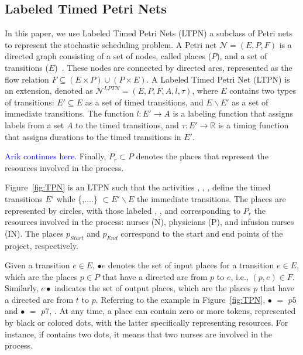 \subsection{Labeled Timed Petri Nets}
\label{sec:LTPN}

In this paper, we use Labeled Timed Petri Nets (LTPN) a subclass of Petri nets to represent the 
stochastic scheduling problem. 
A Petri net $\mathcal{N} = (E, P, F)$ is a directed graph consisting of a set of nodes, called places ($P$), and a set of transitions ($E$)~\cite{murata1989petri}. These nodes are connected by directed arcs, represented as the flow relation $F \subseteq (E \times P) \cup (P \times E)$. A Labeled Timed Petri Net (LTPN) is an extension, denoted as $\mathcal{N}^{LPTN} = (E, P, F, A, l, \tau)$, where $E$ contains two types of transitions: $E' \subseteq E$ as a set of timed transitions, and $E \backslash E'$ as a set of immediate transitions. The function $l : E' \rightarrow A$ is a labeling function that assigns labels from a set $A$ to the timed transitions, and $\tau : E' \rightarrow \mathbb{R}$ is a timing function that assigns durations to the timed transitions in $E'$.

\textcolor{blue}{Arik continues here.}
Finally, $P_r \subset P$ denotes the places that represent the resources involved in the process.

Figure~\ref{fig:TPN} is an LTPN such that the activities , , ,  define the timed transitions $E'$ while \{,....\} $ \subset E'\backslash E$ the immediate transitions.
The places are represented by circles, with those labeled , , and  corresponding to $P_{r}$ the resources involved in the process: nurses (N), physicians (P), and infusion nurses (IN).
The places $p_{Start}$ and $p_{End}$ correspond to the start and end points of the project, respectively.

Given a transition $e \in E$, $\bullet e$ denotes the set of input places for a transition $e \in E$, which are the places $p \in P$ that have a directed arc from $p$ to $e$, i.e., $(p, e) \in F$. Similarly, $e \bullet$ indicates the set of output places, which are the places $p$ that have a directed arc from $t$ to $p$. Referring to the example in Figure~\ref{fig:TPN}, $\bullet$ $=$ {$p5$} and $\bullet$ $=$ {$p7$, }. At any time, a place can contain zero or more tokens, represented by black or colored dots, with the latter specifically representing resources. For instance, if  contains two dots, it means that two nurses are involved in the process.

